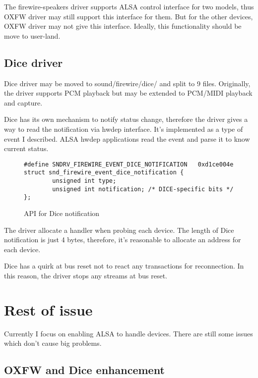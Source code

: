 \documentclass[onecolumn]{article}
\begin{document}
The firewire-speakers driver supports ALSA control interface for two models, thus OXFW driver may still support this interface for them. But for the other devices, OXFW driver may not give this interface. Ideally, this functionality should be move to user-land.

\subsection{Dice driver}

Dice driver may be moved to sound/firewire/dice/ and split to 9 files. Originally, the driver supports PCM playback but may be extended to PCM/MIDI playback and capture.

Dice has its own mechanism to notify status change, therefore the driver gives a way to read the notification via hwdep interface. It's implemented as a type of event I described. ALSA hwdep applications read the event and parse it to know current status.

\begin{figure}[H]
\small
\begin{verbatim}
#define SNDRV_FIREWIRE_EVENT_DICE_NOTIFICATION   0xd1ce004e
struct snd_firewire_event_dice_notification {
        unsigned int type;
        unsigned int notification; /* DICE-specific bits */
};
\end{verbatim}
\caption{API for Dice notification}
\label{uapi-dice-notification}
\end{figure}

The driver allocate a handler when probing each device. The length of Dice notification is just 4 bytes, therefore, it's reasonable to allocate an address for each device.

Dice has a quirk at bus reset not to react any transactions for reconnection. In this reason, the driver stops any streams at bus reset.

\section{Rest of issue}

Currently I focus on enabling ALSA to handle devices. There are still some issues which don't cause big problems.

\subsection{OXFW and Dice enhancement}
\end{document}

